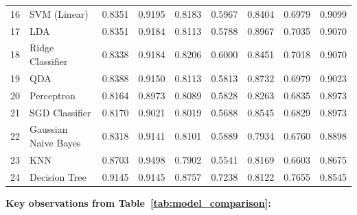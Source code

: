 \documentclass[conference,10pt]{IEEEtran}
\begin{document}
\begin{table}[!t]
{\begin{tabular}{clccccccc}
\midrule
16 & SVM (Linear)                 & 0.8351 & 0.9195 & 0.8183 & 0.5967 & 0.8404 & 0.6979 & 0.9099 \\
17 & LDA                          & 0.8351 & 0.9184 & 0.8113 & 0.5788 & 0.8967 & 0.7035 & 0.9070 \\
18 & Ridge Classifier             & 0.8338 & 0.9184 & 0.8206 & 0.6000 & 0.8451 & 0.7018 & 0.9070 \\
19 & QDA                          & 0.8388 & 0.9150 & 0.8113 & 0.5813 & 0.8732 & 0.6979 & 0.9023 \\
20 & Perceptron                   & 0.8164 & 0.8973 & 0.8089 & 0.5828 & 0.8263 & 0.6835 & 0.8973 \\
\midrule
21 & SGD Classifier               & 0.8170 & 0.9021 & 0.8019 & 0.5688 & 0.8545 & 0.6829 & 0.8973 \\
22 & Gaussian Naive Bayes         & 0.8318 & 0.9141 & 0.8101 & 0.5889 & 0.7934 & 0.6760 & 0.8898 \\
23 & KNN                          & 0.8703 & 0.9498 & 0.7902 & 0.5541 & 0.8169 & 0.6603 & 0.8675 \\
24 & Decision Tree                & 0.9145 & 0.9145 & 0.8757 & 0.7238 & 0.8122 & 0.7655 & 0.8545 \\
\bottomrule
\end{tabular}%
}
\end{table}

\textbf{Key observations from Table~\ref{tab:model_comparison}:}
\end{document}
